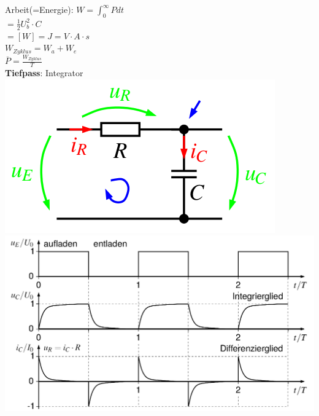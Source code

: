 \documentclass[8pt]{extarticle}
\begin{document}
\begin{minipage}{0.33\textwidth}
Arbeit(=Energie): $W = \int_0^\infty P dt$\\
\phantom{sssssssss} $= \frac{1}{2} U_b^2 \cdot C$ \\
\phantom{sssssssss} $= [W] = J = V \cdot A \cdot s$\\
$W_{Zyklus} = W_a + W_e$\\
$\overline{P} = \frac{W_{Zyklus}}{T}$\\
\textbf{Tiefpass}: Integrator\\
\includegraphics[scale=0.3]{tiefpass.png}\\
\includegraphics[scale=0.1]{tiefpassuit.png}
\end{minipage}%
~~~~~~~
\end{document}
